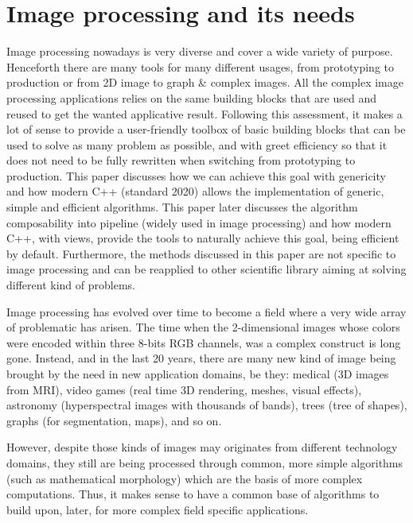 \chapter{Image processing and its needs}
\label{context_and_motivations.chap.image_processing_and_its_needs}

Image processing nowadays is very diverse and cover a wide variety of purpose. Henceforth there are many tools for many
different usages, from prototyping to production or from 2D image to graph \& complex images. All the complex image
processing applications relies on the same building blocks that are used and reused to get the wanted applicative
result. Following this assessment, it makes a lot of sense to provide a user-friendly toolbox of basic building blocks
that can be used to solve as many problem as possible, and with greet efficiency so that it does not need to be fully
rewritten when switching from prototyping to production. This paper discusses how we can achieve this goal with
genericity and how modern C++ (standard 2020) allows the implementation of generic, simple and efficient algorithms.
This paper later discusses the algorithm composability into pipeline (widely used in image processing) and how modern
C++, with views, provide the tools to naturally achieve this goal, being efficient by default. Furthermore, the methods
discussed in this paper are not specific to image processing and can be reapplied to other scientific library aiming at
solving different kind of problems.



Image processing has evolved over time to become a field where a very wide array of problematic has arisen. The time
when the 2-dimensional images whose colors were encoded within three 8-bits RGB channels, was a complex construct is
long gone. Instead, and in the last 20 years, there are many new kind of image being brought by the need in new
application domains, be they: medical (3D images from MRI), video games (real time 3D rendering, meshes, visual
effects), astronomy (hyperspectral images with thousands of bands), trees (tree of shapes), graphs (for segmentation,
maps), and so on.

However, despite those kinds of images may originates from different technology domains, they still are being processed
through common, more simple algorithms (such as mathematical morphology) which are the basis of more complex
computations. Thus, it makes sense to have a common base of algorithms to build upon, later, for more complex field
specific applications.

